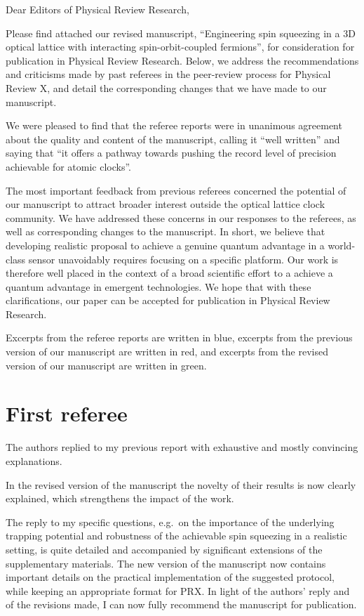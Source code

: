 \documentclass[preprint,superscriptaddress]{revtex4-2}
\newcommand{\blue}[1]{{\color{blue} #1}}
\newcommand{\red}[1]{{\color{red} #1}}
\newcommand{\green}[1]{{\color{ForestGreen} #1}}
\begin{document}
Dear Editors of Physical Review Research,

Please find attached our revised manuscript, ``Engineering spin squeezing in a 3D optical lattice with interacting spin-orbit-coupled fermions'', for consideration for publication in Physical Review Research.
Below, we address the recommendations and criticisms made by past referees in the peer-review process for Physical Review X, and detail the corresponding changes that we have made to our manuscript.

We were pleased to find that the referee reports were in unanimous agreement about the quality and content of the manuscript, calling it ``well written'' and saying that ``it offers a pathway towards pushing the record level of precision achievable for atomic clocks''.

The most important feedback from previous referees concerned the potential of our manuscript to attract broader interest outside the optical lattice clock community.
We have addressed these concerns in our responses to the referees, as well as corresponding changes to the manuscript.
In short, we believe that developing realistic proposal to achieve a genuine quantum advantage in a world-class sensor unavoidably requires focusing on a specific platform.
Our work is therefore well placed in the context of a broad scientific effort to a achieve a quantum advantage in emergent technologies.
We hope that with these clarifications, our paper can be accepted for publication in Physical Review Research.

Excerpts from the referee reports are written in \blue{blue}, excerpts from the previous version of our manuscript are written in \red{red}, and excerpts from the revised version of our manuscript are written in \green{green}.

\section{First referee}

\blue{The authors replied to my previous report with exhaustive and
  mostly convincing explanations.}

\blue{In the revised version of the manuscript the novelty of their
  results is now clearly explained, which strengthens the impact of
  the work.}

\blue{The reply to my specific questions, e.g.~on the importance of
  the underlying trapping potential and robustness of the achievable
  spin squeezing in a realistic setting, is quite detailed and
  accompanied by significant extensions of the supplementary
  materials. The new version of the manuscript now contains important
  details on the practical implementation of the suggested protocol,
  while keeping an appropriate format for PRX. In light of the
  authors' reply and of the revisions made, I can now fully recommend
  the manuscript for publication.}
\end{document}
